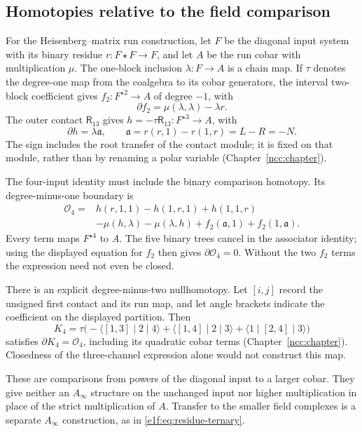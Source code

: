 \subsection{Homotopies relative to the field comparison}

For\label{e1f:def:relative-residue-comparison} the Heisenberg--matrix run construction, let \(F\)
be the diagonal input system with its binary residue
\(r:F\star F\to F\), and let \(A\) be the run cobar
with multiplication \(\mu\). The one-block inclusion
\(\lambda:F\to A\) is a chain map. If \(\tau\) denotes
the degree-one map from the coalgebra to its cobar
generators, the interval two-block coefficient gives
\(f_2:F^{\star2}\to A\) of degree \(-1\), with
\[
 \partial f_2=\mu(\lambda,\lambda)-\lambda r.
\]
The outer contact \(\mathsf R_{13}\) gives
\(h=-\tau\mathsf R_{13}:F^{\star3}\to A\), with
\[
 \partial h=\lambda\mathfrak a,
 \qquad \mathfrak a=r(r,1)-r(1,r)=L-R=-N.
\]
The sign includes the root transfer of the contact module;
it is fixed on that module, rather than by renaming a
polar variable (Chapter~\ref{ncc:chapter}).

The four-input identity must include the binary comparison
homotopy. Its degree-minus-one boundary is
\[
 \begin{aligned}
 \mathcal O_4={}&h(r,1,1)-h(1,r,1)+h(1,1,r)\\
   &-\mu(h,\lambda)-\mu(\lambda,h)
       +f_2(\mathfrak a,1)+f_2(1,\mathfrak a).
 \end{aligned}
\]
Every term maps \(F^{\star4}\) to \(A\).
The five binary trees cancel in the associator identity;
using the displayed equation for \(f_2\) then gives
\(\partial\mathcal O_4=0\). Without the two \(f_2\)
terms the expression need not even be closed.

There is an explicit degree-minus-two nullhomotopy. Let
\([i,j]\) record the unsigned first contact and its run
map, and let angle brackets indicate the coefficient on
the displayed partition. Then
\[
 K_4=\tau\bigl(
       -\langle[1,3]\mid2\mid4\rangle
       +\langle[1,4]\mid2\mid3\rangle
       +\langle1\mid[2,4]\mid3\rangle\bigr)
\]
satisfies \(\partial K_4=\mathcal O_4\), including its
quadratic cobar terms (Chapter~\ref{ncc:chapter}).
Closedness of the three-channel expression alone would
not construct this map.

These are comparisons from powers of the diagonal input
to a larger cobar. They give neither an \(A_\infty\)
structure on the unchanged input nor higher multiplication
in place of the strict multiplication of \(A\). Transfer
to the smaller field complexes is a separate
\(A_\infty\) construction, as in
\eqref{e1f:eq:residue-ternary}.

